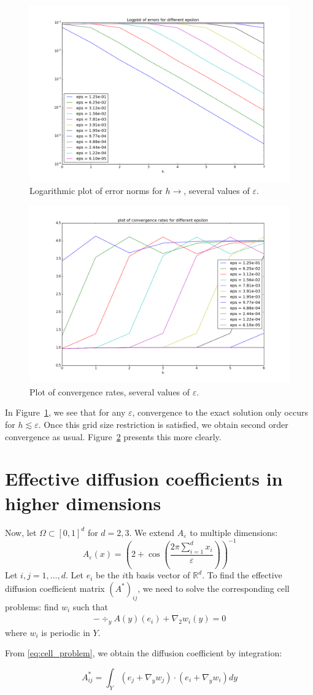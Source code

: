 \documentclass{article}
\renewcommand{\epsilon}{\varepsilon}
\newcommand{\R}{\mathbb{ R}}
\begin{document}
\begin{figure}[ht]
    \centering
    \includegraphics[width=0.5\linewidth]{one_dim_h_eps1.png}
    \caption{Logarithmic plot of error norms for $h\to$, several values of $\epsilon$.}
    \label{fig:one_dim_h_eps1}
\end{figure}

\begin{figure}[ht]
    \centering
    \includegraphics[width=0.5\linewidth]{one_dim_h_eps2.png}
    \caption{Plot of convergence rates, several values of $\epsilon$.}
    \label{fig:one_dim_h_eps2}
\end{figure}

In Figure~\ref{fig:one_dim_h_eps1}, we see that for any $\epsilon$, convergence to the exact solution only occurs for $h \lesssim \epsilon$. Once this grid size restriction is satisfied, we obtain second order convergence as usual. Figure~\ref{fig:one_dim_h_eps2} presents this more clearly.

\section{Effective diffusion coefficients in higher dimensions}
Now, let $\Omega \subset [0,1]^d$ for $d=2,3$. We extend $A_\epsilon$ to multiple dimensions:
\begin{equation}
    A_\epsilon(x) =  \left( 2+\cos\left(\frac{2\pi \sum_{i=1}^dx_i}{\epsilon}\right) \right)^{-1}
\end{equation}
Let $i,j=1,\dots,d$. Let $e_i$ be the $i$th basis vector of $\R^d$. To find the effective diffusion coefficient matrix $(A^*)_{ij}$, we need to solve the corresponding cell problems: find $w_i$ such that
\begin{equation}
    \begin{split}
        -\div_y{A(y)(e_i) + \nabla_2w_i(y)} = 0
    \end{split}
    \label{eq:cell_problem}
\end{equation}
where $w_i$ is periodic in $Y$.

From \eqref{eq:cell_problem}, we obtain the diffusion coefficient by integration:

\begin{equation}
    A^*_{ij} = \int_Y(e_j + \nabla_y w_j)\cdot(e_i + \nabla_y w_i)dy
\end{equation}
\end{document}

